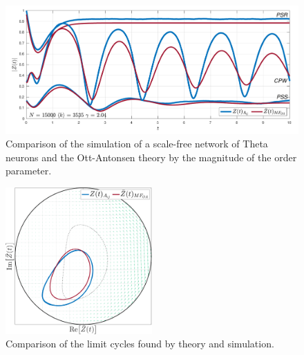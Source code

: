 \begin{figure}[H]
\centering
\includegraphics[width = \textwidth, trim={0 3mm 0 3mm},clip]{../Figures/InspectMeanFieldScaleFree.pdf}
\caption{Comparison of the simulation of a scale-free network of Theta neurons and the Ott-Antonsen theory by the magnitude of the order parameter.}
\label{fig:InspectMeanFieldScaleFree}
\end{figure}

\begin{figure}[H]
\centering
\includegraphics[width = 0.5\textwidth]{../Figures/PhaseSpace/ScalefreeLimCycles.pdf}
\caption{Comparison of the limit cycles found by theory and simulation.}
\label{fig:InspectMeanFieldScaleFreePhaseSpace}
\end{figure}


